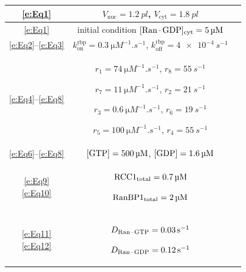 \documentclass[12pt,notitlepage]{article}
\begin{document}
\begin{table}
\centering
\small
\begin{tabular}{c|c|c}
	\hline
	\eqref{e:Eq1}
	&
	$V_\text{nuc} = \SI{1.2}{pl}$,
	\quad
	$V_\text{cyt} = \SI{1.8}{pl}$
	& 
	\cite[Table II]{GoerlichSeewaldRibbeck2003}
	\\
	\hline
	\eqref{e:Eq1}
	&
	initial condition
	$[\ce{Ran . GDP}]_\text{cyt} = \SI{5}{\micro M}$
	&
	\cite[Table II]{GoerlichSeewaldRibbeck2003}
	\\
	\hline
	\eqref{e:Eq2}--\eqref{e:Eq3}
	&
	$k_\text{on}^\text{rbp} = \SI{0.3}{\micro M^{-1}.s^{-1}}$,
	\quad
	$k_\text{off}^\text{rbp} = \SI{4e-4}{s^{-1}}$
	&
	\cite[Supp.~Table~A]{GoerlichSeewaldRibbeck2003}
	\\
	\hline
	\eqref{e:Eq4}--\eqref{e:Eq8}
	&
	\makecell{
		$r_1 = \SI{74}{\micro M^{-1} . s^{-1}}$,
		\quad
		$r_8 = \SI{55}{s^{-1}}$
		\\
		$r_7 = \SI{11}{\micro M^{-1} . s^{-1}}$,
		\quad
		$r_2 = \SI{21}{s^{-1}}$
		\\
		$r_3 = \SI{0.6}{\micro M^{-1} . s^{-1}}$,
		\quad
		$r_6 = \SI{19}{s^{-1}}$
		\\
		$r_5 = \SI{100}{\micro M^{-1} . s^{-1}}$,
		\quad
		$r_4 = \SI{55}{s^{-1}}$
	}
	&
	\makecell{
		\cite[Supp.~Table~A]{GoerlichSeewaldRibbeck2003}
		\\
		\cite[Fig.~6]{KlebePrinzWittinghoferGoody1995}
	}
	\\
	\hline
	\eqref{e:Eq6}--\eqref{e:Eq8}
	&
	$[\ce{GTP}] = \SI{500}{\micro M}$,
	\quad
	$[\ce{GDP}] = \SI{1.6}{\micro M}$
	&
	\cite[Table II]{GoerlichSeewaldRibbeck2003}
	\\
	\hline
	\makecell{
		\eqref{e:Eq9} \\ \eqref{e:Eq10}
	}
	&
	\makecell{
		$\ce{{RCC1}_{total}} = \SI{0.7}{\micro M}$
		\\
		$\ce{{RanBP1}_{total}} = \SI{2}{\micro M}$
	}
	&
	\makecell{
		\cite[Supp.~Table~B]{GoerlichSeewaldRibbeck2003}
		\\
		\cite[Fig.~4]{GoerlichSeewaldRibbeck2003}
	}
	\\
	\hline
	\makecell{
		\eqref{e:Eq11} \\ \eqref{e:Eq12}
	}
	&
	\makecell{
		$D_{\ce{Ran . GTP}} = \SI{0.03}{s^{-1}}$
		\\
		$D_{\ce{Ran . GDP}} = \SI{0.12}{s^{-1}}$
	}
	&
	\cite[Table II]{GoerlichSeewaldRibbeck2003}
	\\
	\hline

\end{tabular}
\end{table}
\end{document}

